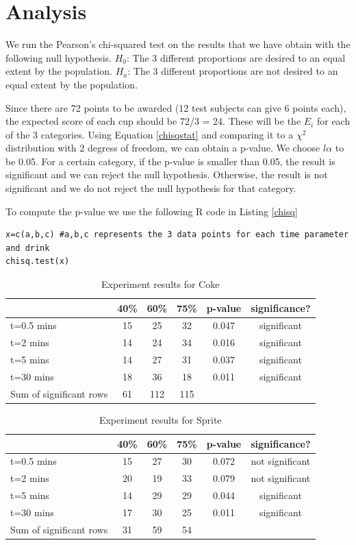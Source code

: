\documentclass[oneside,12pt]{report}
\def\prefacesection#1{
\chapter*{#1}
\addcontentsline{toc}{chapter}{#1}
}
\begin{document}
%

\prefacesection{Analysis}

We run the Pearson's chi-squared test on the results that we have obtain with the following null hypothesis.
\vskip6pt $H_0$: The 3 different proportions are desired to an equal extent by the population.
\vskip3pt $H_a$: The 3 different proportions are not desired to an equal extent by the population.
\vskip6pt

Since there are 72 points to be awarded (12 test subjects can give 6 points each), the expected score of each cup should be 72/3 = 24. These will be the $E_i$ for each of the 3 categories. Using Equation \eqref{chisqstat} and comparing it to a $\chi^2$ distribution with 2 degress of freedom, we can obtain a p-value. We choose $l\alpha$ to be 0.05. For a certain category, if the p-value is smaller than 0.05, the result is significant and we can reject the null hypothesis. Otherwise, the result is not significant and we do not reject the null hypothesis for that category.

To compute the p-value we use the following R code in Listing \ref{chisq}
\begin{lstlisting}[caption= R code for chi-squared test, label=chisq]
x=c(a,b,c) #a,b,c represents the 3 data points for each time parameter and drink
chisq.test(x)
\end{lstlisting}


\begin{table}[ h]
\centering
\begin{tabular}{ l || c|c|c||c|c }
  &40\% &60\% & 75\% &p-value &significance? \\
\hline  
t=0.5 mins & 15 & 25 & 32 & 0.047&significant\\ 
\hline  
t=2 mins & 14 & 24 & 34&0.016&significant\\ 
\hline  
t=5 mins & 14 & 27 & 31&0.037&significant\\ 
\hline  
t=30 mins & 18 & 36 & 18&0.011&significant\\ 
\hline
Sum of significant rows & 61 & 112 & 115 & & \\ 
\hline     
 \end{tabular}
\caption{Experiment results for Coke}
\end{table}

\begin{table}[ h]
\centering
\begin{tabular}{ l || c|c|c||c|c }
  &40\% &60\% & 75\% &p-value &significance? \\
\hline  
t=0.5 mins & 15 & 27 & 30&0.072&not significant\\ 
\hline  
t=2 mins & 20 & 19 & 33&0.079&not significant\\ 
\hline  
t=5 mins & 14 & 29 & 29&0.044&significant\\ 
\hline  
t=30 mins & 17 & 30 & 25&0.011&significant\\ 
\hline  
Sum of significant rows & 31 & 59 & 54 & & \\ 
\hline     

 \end{tabular}
\caption{Experiment results for Sprite}
\end{table}
\end{document}
